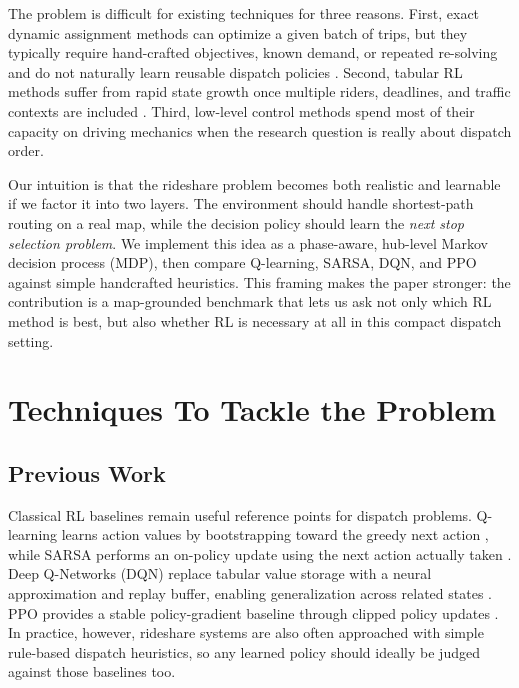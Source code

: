 \documentclass{article}
\begin{document}
The problem is difficult for existing techniques for three reasons. First, exact dynamic assignment methods can optimize a given batch of trips, but they typically require hand-crafted objectives, known demand, or repeated re-solving and do not naturally learn reusable dispatch policies \citep{alonso2017ride}. Second, tabular RL methods suffer from rapid state growth once multiple riders, deadlines, and traffic contexts are included \citep{watkins1992q, rummery1994line}. Third, low-level control methods spend most of their capacity on driving mechanics when the research question is really about dispatch order.

Our intuition is that the rideshare problem becomes both realistic and learnable if we factor it into two layers. The environment should handle shortest-path routing on a real map, while the decision policy should learn the \emph{next stop selection problem}. We implement this idea as a phase-aware, hub-level Markov decision process (MDP), then compare Q-learning, SARSA, DQN, and PPO against simple handcrafted heuristics. This framing makes the paper stronger: the contribution is a map-grounded benchmark that lets us ask not only which RL method is best, but also whether RL is necessary at all in this compact dispatch setting.

\section{Techniques To Tackle the Problem}

\subsection{Previous Work}
Classical RL baselines remain useful reference points for dispatch problems. Q-learning learns action values by bootstrapping toward the greedy next action \citep{watkins1992q}, while SARSA performs an on-policy update using the next action actually taken \citep{rummery1994line}. Deep Q-Networks (DQN) replace tabular value storage with a neural approximation and replay buffer, enabling generalization across related states \citep{mnih2015dqn}. PPO provides a stable policy-gradient baseline through clipped policy updates \citep{schulman2017ppo}. In practice, however, rideshare systems are also often approached with simple rule-based dispatch heuristics, so any learned policy should ideally be judged against those baselines too.
\end{document}
